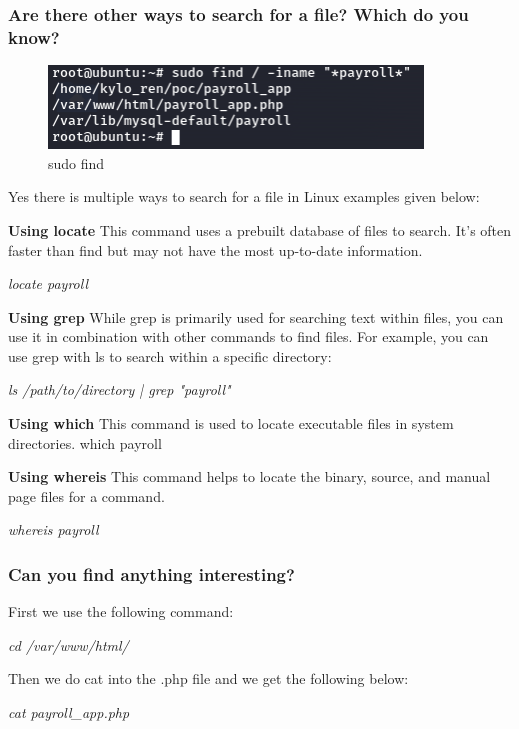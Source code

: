 \subsubsection{Are there other ways to search for a file? Which do you know?}
\begin{figure}[H]
      \centering
      \includegraphics[width=0.6\linewidth]{pic/sudo find.png}
      \caption{sudo find}
      \label{fig:sudo find}
\end{figure}

Yes there is multiple ways to search for a file in Linux examples given below:

\textbf{Using locate}
This command uses a prebuilt database of files to search. It's often faster than find
but may not have the most up-to-date information.

\textit{locate payroll}

\textbf{Using grep}
While grep is primarily used for searching text within files, you can use it in
combination with other commands to find files. For example, you can use grep with ls
to search within a specific directory:

\textit{ls /path/to/directory | grep "payroll"}

\textbf{Using which}
This command is used to locate executable files in system directories.
which payroll

\textbf{Using whereis}
This command helps to locate the binary, source, and manual page files for a
command.

\textit{whereis payroll}


\subsubsection{Can you find anything interesting?}
First we use the following command:

\textit{cd /var/www/html/}

Then we do cat into the .php file and we get the following below:

\textit{cat payroll\_app.php}


